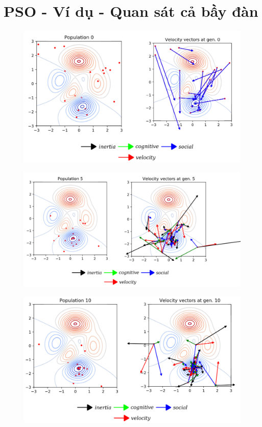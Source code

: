 \documentclass{book}
\begin{document}
\section{PSO - Ví dụ - Quan sát cả bầy đàn}
\begin{figure}[H]
    \centering
    \includegraphics[width=0.75\linewidth]{images/GA-3_50.png}
\end{figure}

\begin{figure}[H]
    \centering
    \includegraphics[width=0.75\linewidth]{images/GA-3_51.png}
\end{figure}

\begin{figure}[H]
    \centering
    \includegraphics[width=0.75\linewidth]{images/GA-3_52.png}
\end{figure}
\end{document}
